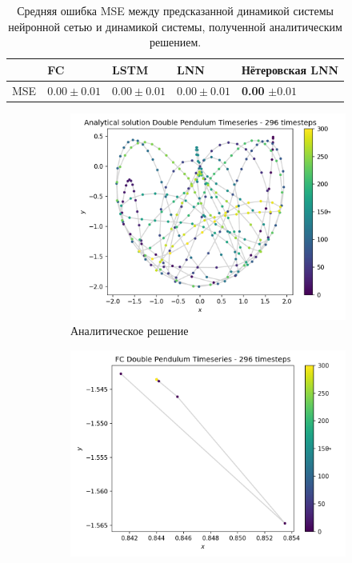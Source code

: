 \documentclass[12pt]{article}
\begin{document}
	\begin{table}[]
		\begin{tabular}{|l|l|l|l|l|}
			\hline
			& FC          & LSTM        & LNN         & Нётеровская LNN \\ \hline
			MSE & $0.00 \pm 0.01$ & $0.00 \pm 0.01$ & $0.00 \pm 0.01$ & \textbf{0.00} $ \pm 0.01$ \\ \hline
		\end{tabular}
		\caption{Средняя ошибка MSE между предсказанной динамикой системы нейронной сетью и динамикой системы, полученной аналитическим решением.}
	\end{table}

	\begin{figure}[H]
		\centering
		\begin{subfigure}[b]{0.49\textwidth}
			\centering
			\includegraphics[width=\textwidth]{predicted_trajectory_Analytical solution.png}
			\caption{Аналитическое решение}
			\label{fig:y equals x}
		\end{subfigure}
		\hfill
		\begin{subfigure}[b]{0.49\textwidth}
			\centering
			\includegraphics[width=\textwidth]{predicted_trajectory_FC.png}

\end{subfigure}
\end{figure}
\end{document}
